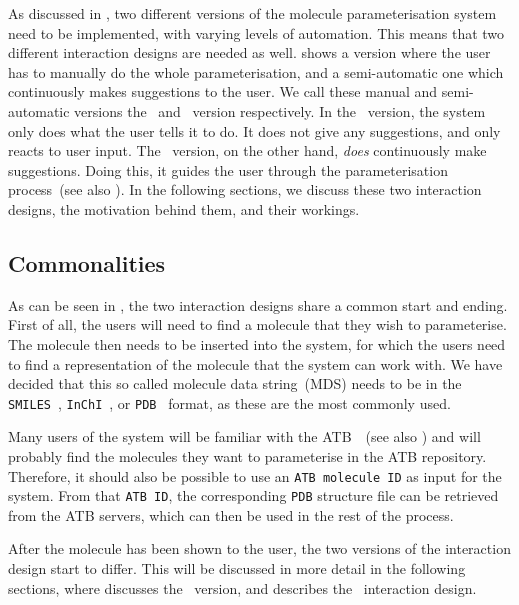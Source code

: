 As discussed in , two different versions of the molecule parameterisation system need to be implemented, with varying levels of automation. This means that two different interaction designs are needed as well.  shows a version where the user has to manually do the whole parameterisation, and a semi-automatic one which continuously makes suggestions to the user. We call these manual and semi-automatic versions the \IDa\ and \IDb\ version respectively. In the \IDa\ version, the system only does what the user tells it to do. It does not give any suggestions, and only reacts to user input. The \IDb\ version, on the other hand, \emph{does} continuously make suggestions. Doing this, it guides the user through the parameterisation process~(see also ). In the following sections,  we discuss these two interaction designs, the motivation behind them, and their workings.


\subsection{Commonalities}
As can be seen in , the two interaction designs share a common start and ending. First of all, the users will need to find a molecule that they wish to parameterise. The molecule then needs to be inserted into the system, for which the users need to find a representation of the molecule that the system can work with. We have decided that this so called molecule data string~(MDS) needs to be in the \verb|SMILES|~\cite{daylight1992daylight}, \verb|InChI|~\cite{heller2013inchi}, or \verb|PDB|~\cite{bernstein1977protein} format, as these are the most commonly used.

Many users of the system will be familiar with the ATB~\cite{malde2011automated}~(see also ) and will probably find the molecules they want to parameterise in the ATB repository. Therefore, it should also be possible to use an \verb|ATB molecule ID| as input for the system. From that \verb|ATB ID|, the corresponding \verb|PDB| structure file can be retrieved from the ATB servers, which can then be used in the rest of the process.

After the molecule has been shown to the user, the two versions of the interaction design start to differ. This will be discussed in more detail in the following sections, where  discusses the \IDa\ version, and  describes the \IDb\ interaction design.

